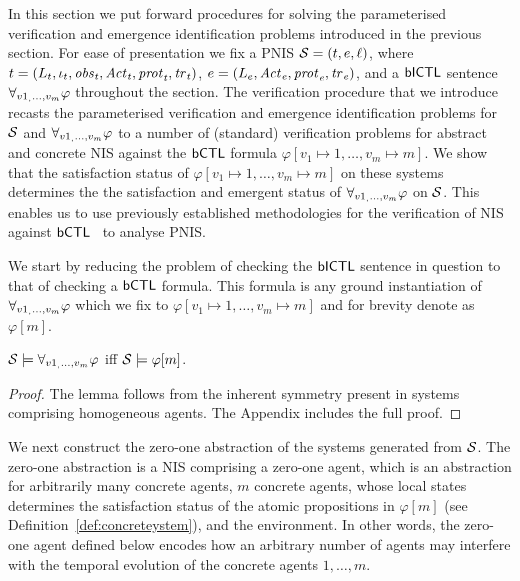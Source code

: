 In this section we put forward  procedures for solving the parameterised
verification and emergence identification problems introduced in the previous
section. For ease of presentation we fix a PNIS $\mathcal S = \left ( t, e, \ell \right )$,
where ${t} = \left ( L_{t}, \iota_{t}, \it{obs}_{t}, \it{Act}_{t}, \it{prot}_{t}, \it{tr}_{t}  \right )$,
${e} = \left ( L_{e}, \it{Act}_{e}, \it{prot}_{e}, \it{tr}_{e}  \right )$, and a $\sf{bICTL}$ sentence
$\forall_{v1_,\ldots,v_m} \varphi$ throughout the section. The verification procedure that we
introduce recasts the parameterised verification  and emergence identification
problems for $\mathcal S$ and $\forall_{v1_,\ldots,v_m} \varphi$  to a number of  (standard) verification
problems for  abstract and concrete NIS  against the $\sf{bCTL}$ formula
$\varphi[v_1 \mapsto 1, \ldots, v_m \mapsto m]$.  We show that the satisfaction
status of $\varphi[v_1 \mapsto 1, \ldots, v_m \mapsto m]$ on 
these systems determines the the satisfaction and emergent status of
$\forall_{v1_,\ldots,v_m} \varphi$ on $\mathcal S$. This enables us to use previously established
methodologies for the verification of NIS against $\sf{bCTL}$~\cite{Akintunde+20b}
to analyse PNIS.


We start by reducing the problem of checking the $\sf{bICTL}$ sentence in question
to that of checking a $\sf{bCTL}$ formula. This formula is any ground instantiation
of $\forall_{v1_,\ldots,v_m} \varphi$ which we fix to $\varphi[v_1 \mapsto 1, \ldots, v_m \mapsto m]$
and for brevity denote as $\varphi[m]$.


\begin{lemma}
\label{lemma:symmetry}
$\mathcal S \models \forall_{v1_,\ldots,v_m} \varphi$ iff $\mathcal S \models \varphi[m]$.
\end{lemma}
\begin{proof}
The lemma follows from the inherent symmetry present in systems comprising
homogeneous agents. The Appendix includes the full proof.
\end{proof}

We next construct the zero-one abstraction of the systems generated from
$\mathcal S$. The zero-one abstraction is a NIS comprising a zero-one agent, which is
an abstraction for arbitrarily many concrete agents, $m$ concrete agents, whose
local states determines the satisfaction status of the atomic propositions in
$\varphi[m]$ (see
Definition~\ref{def:concreteystem}), and the environment. In other words, the
zero-one agent defined below encodes how an arbitrary number of agents may
interfere with the temporal evolution of the concrete agents $1, \ldots, m$.

